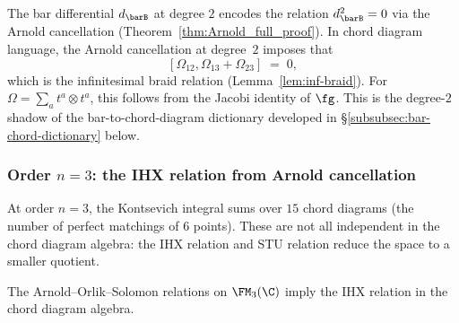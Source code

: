 \begin{remark}
\label{rem:bar-degree-2-jacobi}
The bar differential $d_{\barB}$ at degree $2$ encodes
the relation $d_{\barB}^2 = 0$ via the Arnold cancellation
(Theorem~\ref{thm:Arnold_full_proof}).
In chord diagram language, the Arnold cancellation at degree~$2$
imposes that
\[
[\Omega_{12}, \Omega_{13} + \Omega_{23}] \;=\; 0,
\]
which is the infinitesimal braid relation
(Lemma~\ref{lem:inf-braid}). For
$\Omega = \sum_a t^a \otimes t^a$, this follows from the Jacobi
identity of $\fg$. This is the degree-$2$ shadow of the
bar-to-chord-diagram dictionary developed in
\S\ref{subsubsec:bar-chord-dictionary} below.
\end{remark}

\subsubsection{Order $n = 3$: the IHX relation from Arnold
cancellation}

At order $n = 3$, the Kontsevich integral sums over $15$ chord
diagrams (the number of perfect matchings of $6$ points). These
are not all independent in the chord diagram algebra: the
IHX relation and STU relation reduce the space to a smaller
quotient.

\begin{proposition}
\label{prop:IHX-from-Arnold}
The Arnold--Orlik--Solomon relations on $\FM_3(\C)$
imply the IHX relation in the chord diagram algebra.
\end{proposition}

